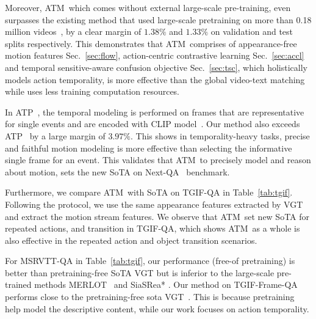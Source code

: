 \documentclass[sigconf]{acmart}
\newcommand{\methodname}{ATM~}
\begin{document}
Moreover, \methodname which comes without external large-scale pre-training, even surpasses the existing method that used large-scale pretraining on more than 0.18 million videos~\cite{bain2021frozen}, by a clear margin of $1.38\%$ and $1.33\%$ on validation and test splits respectively.  
This demonstrates that \methodname comprises of appearance-free motion features Sec.~\ref{sec:flow}, action-centric contrastive learning Sec.~\ref{sec:accl} and temporal sensitive-aware confusion objective Sec.~\ref{sec:tsc}, which holistically models action temporality, is more effective than the global video-text matching while uses less training computation resources.

In ATP~\cite{buch2022revisiting}, the temporal modeling is performed on frames that are representative for single events and are encoded with CLIP model~\cite{radford2021learning}. Our method also exceeds ATP~\cite{buch2022revisiting} by a large margin of $3.97\%$. 
This shows in temporality-heavy tasks, precise and faithful motion modeling is more effective than selecting the informative single frame for an event.
This validates that \methodname to precisely model and reason about motion, sets the new SoTA on Next-QA~\cite{xiao2021next} benchmark.

Furthermore, we compare \methodname with SoTA on TGIF-QA in Table~\ref{tab:tgif}. Following the protocol, we use the same appearance features extracted by VGT~\cite{xiao2022vgt} and extract the motion stream features. 
We observe that \methodname set new SoTA for repeated actions, and transition in TGIF-QA, which shows \methodname as a whole is also effective in the repeated action and object transition scenarios. 

For MSRVTT-QA in Table~\ref{tab:tgif}, our performance (free-of pretraining) is better than pretraining-free SoTA VGT but is inferior to the large-scale pre-trained methods MERLOT~\cite{zellers2021merlot} and SiaSRea* \cite{yu2021learning}. 
Our method on TGIF-Frame-QA performs close to the pretraining-free sota VGT~\cite{xiao2022vgt}.
This is because pretraining help model the descriptive content, while our work focuses on action temporality. 
\end{document}
